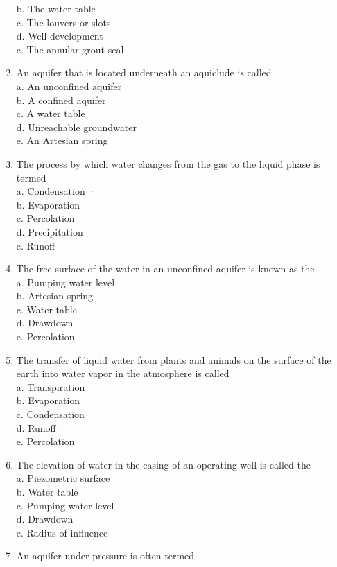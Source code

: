 \begin{enumerate}
b. The water table\\
c. The louvers or slots\\
d. Well development\\
e. The annular grout seal\\
\item An aquifer that is located underneath an aquiclude is called\\
a. An unconfined aquifer\\
b. A confined aquifer\\
c. A water table\\
d. Unreachable groundwater\\
e. An Artesian spring\\
\item The process by which water changes from the gas to the liquid phase is termed\\
a. Condensation ·\\
b. Evaporation\\
c. Percolation\\
d. Precipitation\\
e. Runoff\\
\item The free surface of the water in an unconfined aquifer is known as the\\
a. Pumping water level\\
b. Artesian spring\\
c. Water table\\
d. Drawdown\\
e. Percolation\\
\item The transfer of liquid water from plants and animals on the surface of the earth into water vapor in the atmosphere is called\\
a. Transpiration\\
b. Evaporation\\
c. Condensation\\
d. Runoff\\
e. Percolation\\
\item The elevation of water in the casing of an operating well is called the\\
a. Piezometric surface\\
b. Water table\\
c. Pumping water level\\
d. Drawdown\\
e. Radius of influence\\
\item An aquifer under pressure is often termed\\

\end{enumerate}
